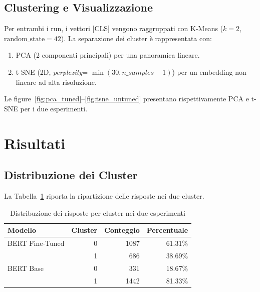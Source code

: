 \documentclass[a4paper,12pt]{article}
\begin{document}
\subsection{Clustering e Visualizzazione}
Per entrambi i run, i vettori [CLS] vengono raggruppati con K-Means (\(k=2\), \(\mathrm{random\_state}=42\)). La separazione dei cluster è rappresentata con:
\begin{enumerate}
  \item PCA (2 componenti principali) per una panoramica lineare.
  \item t-SNE (2D, \textit{perplexity}= \(\min(30,n\!\_samples-1)\)) per un embedding non lineare ad alta risoluzione.
\end{enumerate}
Le figure~\ref{fig:pca_tuned}--\ref{fig:tsne_untuned} presentano rispettivamente PCA e t-SNE per i due esperimenti.

\section{Risultati}
\subsection{Distribuzione dei Cluster}
La Tabella~\ref{tab:distribuzione} riporta la ripartizione delle risposte nei due cluster.

\begin{table}[h]
  \centering
  \caption{Distribuzione dei risposte per cluster nei due esperimenti}
  \label{tab:distribuzione}
  \begin{tabular}{lrrr}
    \hline
    \textbf{Modello} & \textbf{Cluster} & \textbf{Conteggio} & \textbf{Percentuale} \\
    \hline
    BERT Fine-Tuned & 0 & 1087 & 61.31\% \\
                    & 1 &  686 & 38.69\% \\
    BERT Base      & 0 &  331 & 18.67\% \\
                    & 1 & 1442 & 81.33\% \\
    \hline
  \end{tabular}
\end{table}
\end{document}
